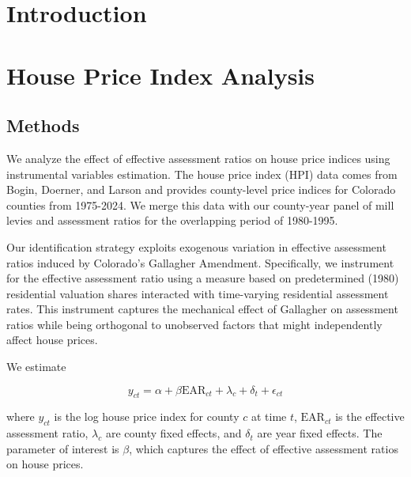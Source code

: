 \documentclass[11pt,article,oneside]{memoir}
\author{\Large Colin
Williams\vspace{0.05in} \newline\normalsize\emph{University of
Virginia} \newline\footnotesize \protect\url{chv7bg@virginia.edu}\vspace*{0.2in}\newline }
\date{}
\begin{document}
  
\pagestyle{kjh}





\hypertarget{introduction}{%
\section{Introduction}\label{introduction}}

\hypertarget{house-price-index-analysis}{%
\section{House Price Index Analysis}\label{house-price-index-analysis}}

\hypertarget{methods}{%
\subsection{Methods}\label{methods}}

We analyze the effect of effective assessment ratios on house price
indices using instrumental variables estimation. The house price index
(HPI) data comes from Bogin, Doerner, and Larson and provides
county-level price indices for Colorado counties from 1975-2024. We
merge this data with our county-year panel of mill levies and assessment
ratios for the overlapping period of 1980-1995.

Our identification strategy exploits exogenous variation in effective
assessment ratios induced by Colorado's Gallagher Amendment.
Specifically, we instrument for the effective assessment ratio using a
measure based on predetermined (1980) residential valuation shares
interacted with time-varying residential assessment rates. This
instrument captures the mechanical effect of Gallagher on assessment
ratios while being orthogonal to unobserved factors that might
independently affect house prices.

We estimate

\[y_{ct} = \alpha + \beta \text{EAR}_{ct} + \lambda_c + \delta_t + \epsilon_{ct}\]

where \(y_{ct}\) is the log house price index for county \(c\) at time
\(t\), \(\text{EAR}_{ct}\) is the effective assessment ratio,
\(\lambda_c\) are county fixed effects, and \(\delta_t\) are year fixed
effects. The parameter of interest is \(\beta\), which captures the
effect of effective assessment ratios on house prices.
\end{document}
